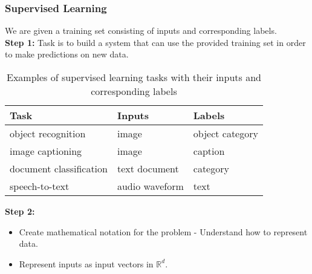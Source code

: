 \documentclass{article}
\begin{document}
\subsubsection*{Supervised Learning}
We are given a training set consisting of inputs and corresponding labels. \\

\textbf{Step 1:} Task is to build a system that can use the provided training set in order to make predictions on new data.

\begin{table}[!h]
\centering
\begin{tabular}{|l|l|l|}
\hline
\textbf{Task} & \textbf{Inputs} & \textbf{Labels} \\
\hline
object recognition & image & object category \\
\hline
image captioning & image & caption \\
\hline
document classification & text document & category \\
\hline
speech-to-text & audio waveform & text \\
\hline
\end{tabular}
\caption{Examples of supervised learning tasks with their inputs and corresponding labels}
\label{tab:supervised-learning-examples}
\end{table}

\textbf{Step 2:} 
\begin{itemize}
  \item Create mathematical notation for the problem - Understand
how to represent data.
  \item Represent inputs as input vectors in $\mathbb{R}^d$.
\end{itemize}
\end{document}
